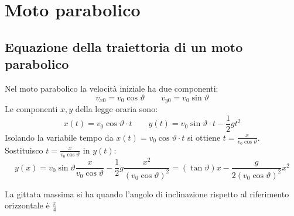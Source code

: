 \section{Moto parabolico}

\subsection{Equazione della traiettoria di un moto parabolico}

Nel moto parabolico la velocità iniziale ha due componenti: \[v_{x0}=v_0\cos \vartheta\qquad v_{y0}=v_0\sin \vartheta\]
Le componenti $x,y$ della legge oraria sono: \[x(t)=v_0\cos \vartheta \cdot t \qquad y(t)=v_0\sin \vartheta \cdot t - \frac{1}{2}gt^2 \]
Isolando la variabile tempo da $x(t)=v_0\cos \vartheta \cdot t$ si ottiene $t=\frac{x}{v_0 \cos \vartheta}$.
Sostituisco $t=\frac{x}{v_0 \cos \vartheta}$ in $y(t)$: 
\begin{equation} 
y(x)=v_0 \sin\vartheta \frac{x}{v_0\cos\vartheta}-\frac{1}{2}g \frac{x^2}{(v_0\cos \vartheta)^2 }=(\tan \vartheta)x-\frac{g}{2(v_0\cos \vartheta)^2}x^2
\end{equation}

La gittata massima si ha quando l'angolo di inclinazione rispetto al riferimento orizzontale è $\frac{\pi}{4}$
